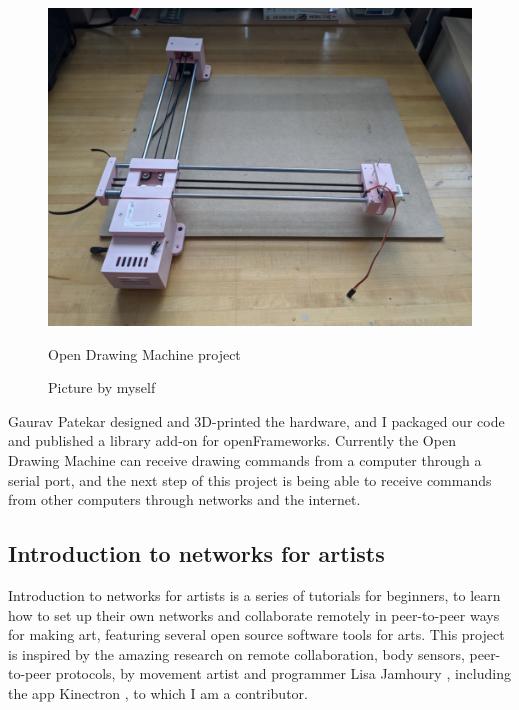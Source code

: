 \begin{figure}[ht]
  \centering
  \includegraphics[width=0.75\linewidth,height=0.25\textheight,keepaspectratio]{images/open-drawing-machine.jpg}
  \caption{Open Drawing Machine project}
  \caption*{Picture by myself}
  \label{fig:open-drawing-machine}
\end{figure}

Gaurav Patekar designed and 3D-printed the hardware, and I packaged our code and published a library add-on for openFrameworks. Currently the Open Drawing Machine can receive drawing commands from a computer through a serial port, and the next step of this project is being able to receive commands from other computers through networks and the internet.

\subsection{Introduction to networks for artists}

Introduction to networks for artists \cite{website-intro-to-computer-networks-for-artists} is a series of tutorials for beginners, to learn how to set up their own networks and collaborate remotely in peer-to-peer ways for making art, featuring several open source software tools for arts. This project is inspired by the amazing research on remote collaboration, body sensors, peer-to-peer protocols, by movement artist and programmer Lisa Jamhoury \cite{website-lisa-jamhoury}, including the app Kinectron \cite{website-repository-kinectron}, to which I am a contributor.

